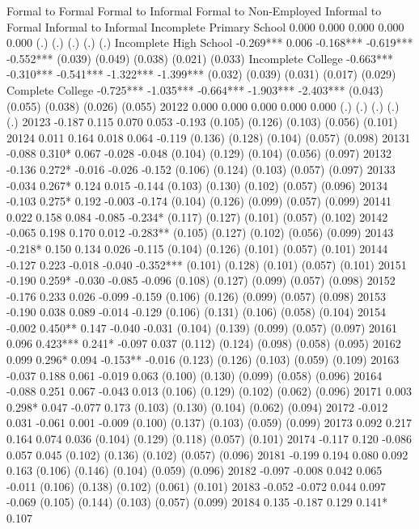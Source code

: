 	Formal to Formal	Formal to Informal	Formal to Non-Employed	Informal to Formal	Informal to Informal
Incomplete Primary School	0.000	0.000	0.000	0.000	0.000
	(.)	(.)	(.)	(.)	(.)
Incomplete High School	-0.269***	0.006	-0.168***	-0.619***	-0.552***
	(0.039)	(0.049)	(0.038)	(0.021)	(0.033)
Incomplete College	-0.663***	-0.310***	-0.541***	-1.322***	-1.399***
	(0.032)	(0.039)	(0.031)	(0.017)	(0.029)
Complete College	-0.725***	-1.035***	-0.664***	-1.903***	-2.403***
	(0.043)	(0.055)	(0.038)	(0.026)	(0.055)
20122	0.000	0.000	0.000	0.000	0.000
	(.)	(.)	(.)	(.)	(.)
20123	-0.187	0.115	0.070	0.053	-0.193
	(0.105)	(0.126)	(0.103)	(0.056)	(0.101)
20124	0.011	0.164	0.018	0.064	-0.119
	(0.136)	(0.128)	(0.104)	(0.057)	(0.098)
20131	-0.088	0.310*	0.067	-0.028	-0.048
	(0.104)	(0.129)	(0.104)	(0.056)	(0.097)
20132	-0.136	0.272*	-0.016	-0.026	-0.152
	(0.106)	(0.124)	(0.103)	(0.057)	(0.097)
20133	-0.034	0.267*	0.124	0.015	-0.144
	(0.103)	(0.130)	(0.102)	(0.057)	(0.096)
20134	-0.103	0.275*	0.192	-0.003	-0.174
	(0.104)	(0.126)	(0.099)	(0.057)	(0.099)
20141	0.022	0.158	0.084	-0.085	-0.234*
	(0.117)	(0.127)	(0.101)	(0.057)	(0.102)
20142	-0.065	0.198	0.170	0.012	-0.283**
	(0.105)	(0.127)	(0.102)	(0.056)	(0.099)
20143	-0.218*	0.150	0.134	0.026	-0.115
	(0.104)	(0.126)	(0.101)	(0.057)	(0.101)
20144	-0.127	0.223	-0.018	-0.040	-0.352***
	(0.101)	(0.128)	(0.101)	(0.057)	(0.101)
20151	-0.190	0.259*	-0.030	-0.085	-0.096
	(0.108)	(0.127)	(0.099)	(0.057)	(0.098)
20152	-0.176	0.233	0.026	-0.099	-0.159
	(0.106)	(0.126)	(0.099)	(0.057)	(0.098)
20153	-0.190	0.038	0.089	-0.014	-0.129
	(0.106)	(0.131)	(0.106)	(0.058)	(0.104)
20154	-0.002	0.450**	0.147	-0.040	-0.031
	(0.104)	(0.139)	(0.099)	(0.057)	(0.097)
20161	0.096	0.423***	0.241*	-0.097	0.037
	(0.112)	(0.124)	(0.098)	(0.058)	(0.095)
20162	0.099	0.296*	0.094	-0.153**	-0.016
	(0.123)	(0.126)	(0.103)	(0.059)	(0.109)
20163	-0.037	0.188	0.061	-0.019	0.063
	(0.100)	(0.130)	(0.099)	(0.058)	(0.096)
20164	-0.088	0.251	0.067	-0.043	0.013
	(0.106)	(0.129)	(0.102)	(0.062)	(0.096)
20171	0.003	0.298*	0.047	-0.077	0.173
	(0.103)	(0.130)	(0.104)	(0.062)	(0.094)
20172	-0.012	0.031	-0.061	0.001	-0.009
	(0.100)	(0.137)	(0.103)	(0.059)	(0.099)
20173	0.092	0.217	0.164	0.074	0.036
	(0.104)	(0.129)	(0.118)	(0.057)	(0.101)
20174	-0.117	0.120	-0.086	0.057	0.045
	(0.102)	(0.136)	(0.102)	(0.057)	(0.096)
20181	-0.199	0.194	0.080	0.092	0.163
	(0.106)	(0.146)	(0.104)	(0.059)	(0.096)
20182	-0.097	-0.008	0.042	0.065	-0.011
	(0.106)	(0.138)	(0.102)	(0.061)	(0.101)
20183	-0.052	-0.072	0.044	0.097	-0.069
	(0.105)	(0.144)	(0.103)	(0.057)	(0.099)
20184	0.135	-0.187	0.129	0.141*	0.107
